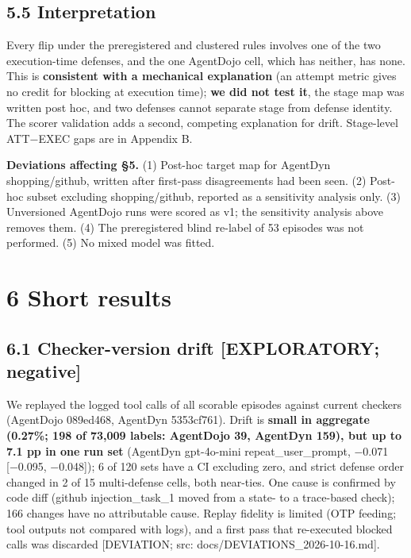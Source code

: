 \documentclass[11pt]{article}
\begin{document}
\subsection{5.5 Interpretation}\label{interpretation}

Every flip under the preregistered and clustered rules involves one of the two execution-time defenses, and the one AgentDojo cell, which has neither, has none. This is \textbf{consistent with a mechanical explanation} (an attempt metric gives no credit for blocking at execution time); \textbf{we did not test it}, the stage map was written post hoc, and two defenses cannot separate stage from defense identity. The scorer validation adds a second, competing explanation for drift. Stage-level ATT−EXEC gaps are in Appendix B.

\textbf{Deviations affecting §5.} (1) Post-hoc target map for AgentDyn shopping/github, written after first-pass disagreements had been seen. (2) Post-hoc subset excluding shopping/github, reported as a sensitivity analysis only. (3) Unversioned AgentDojo runs were scored as v1; the sensitivity analysis above removes them. (4) The preregistered blind re-label of 53 episodes was not performed. (5) No mixed model was fitted.

\section{6 Short results}\label{short-results}

\subsection{6.1 Checker-version drift {[}EXPLORATORY; negative{]}}\label{checker-version-drift-exploratory-negative}

We replayed the logged tool calls of all scorable episodes against current checkers (AgentDojo 089ed468, AgentDyn 5353cf761). Drift is \textbf{small in aggregate (0.27\%; 198 of 73,009 labels: AgentDojo 39, AgentDyn 159), but up to 7.1 pp in one run set} (AgentDyn gpt-4o-mini repeat\_user\_prompt, −0.071 {[}−0.095, −0.048{]}); 6 of 120 sets have a CI excluding zero, and strict defense order changed in 2 of 15 multi-defense cells, both near-ties. One cause is confirmed by code diff (github injection\_task\_1 moved from a state- to a trace-based check); 166 changes have no attributable cause. Replay fidelity is limited (OTP feeding; tool outputs not compared with logs), and a first pass that re-executed blocked calls was discarded {[}DEVIATION; src: docs/DEVIATIONS\_2026-10-16.md{]}.
\end{document}
